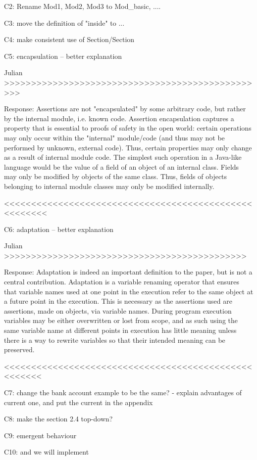 C2: Rename Mod1, Mod2, Mod3 to Mod_{basic}, ....

C3: move the definition of "inside" to ...

C4: make consistent use of Section/Section

C5: encapsulation -- better explanation

Julian >>>>>>>>>>>>>>>>>>>>>>>>>>>>>>>>>>>>>>>>>>>>>>>>>

Response:
Assertions are not "encapsulated" by some arbitrary code, but rather by the internal module, i.e. known code. Assertion encapsulation captures a property that is essential to proofs of safety in the open world: certain operations may only occur within the "internal" module/code (and thus may not be performed by unknown, external code). Thus, certain properties may only change as a result of internal module code. The simplest such operation in a Java-like language would be the value of a field of an object of an internal class. Fields may only be modified by objects of the same class. Thus, fields of objects belonging to internal module classes may only be modified internally.

<<<<<<<<<<<<<<<<<<<<<<<<<<<<<<<<<<<<<<<<<<<<<<<<<<<<<<

C6: adaptation -- better explanation

Julian >>>>>>>>>>>>>>>>>>>>>>>>>>>>>>>>>>>>>>>>>>>>>

Response:
Adaptation is indeed an important definition to the paper, but is not a central contribution. Adaptation is a variable renaming operator that ensures that variable names used at one point in the execution refer to the same object at a future point in the execution. This is necessary as the assertions used are assertions, made on objects, via variable names. During program execution variables may be either overwritten or lost from scope, and as such using the same variable name at different points in execution has little meaning unless there is a way to rewrite variables so that their intended meaning can be preserved. 

<<<<<<<<<<<<<<<<<<<<<<<<<<<<<<<<<<<<<<<<<<<<<<<<<<<<<

C7: change the bank account example to be the same?
- explain advantages of current one, and put the current in the appendix

C8: make the section 2.4 top-down?

C9: emergent behaviour 

C10: and we will implement
 


